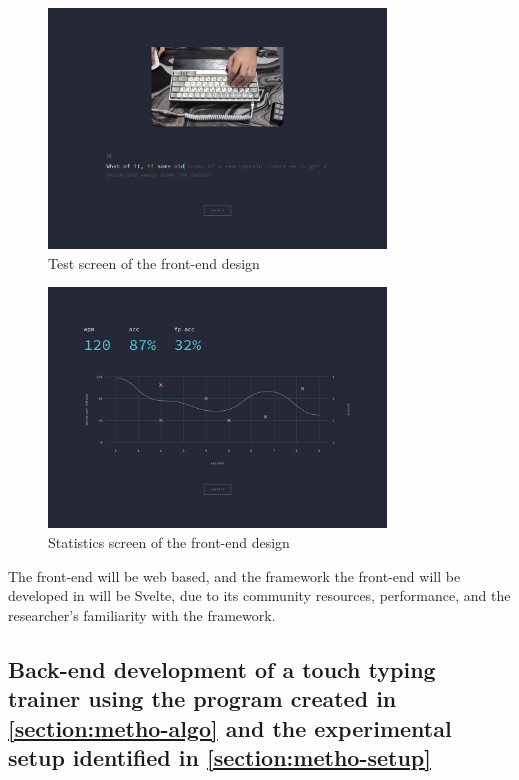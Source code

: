 \documentclass{report}
\begin{document}
\begin{figure}[H]
	\centering
	\includegraphics[width=0.8\textwidth]{ui-test.png}
	\caption{Test screen of the front-end design}
	\label{fig:ui-test}
	\centering
\end{figure}

\begin{figure}[H]
	\centering
	\includegraphics[width=0.8\textwidth]{ui-stats.png}
	\caption{Statistics screen of the front-end design}
	\label{fig:ui-stat}
	\centering
\end{figure}

The front-end will be web based, and the framework the front-end will be
developed in will be Svelte, due to its community resources, performance, and
the researcher's familiarity with the framework.



\subsection{Back-end development of a touch typing trainer using the program created
	in \ref{section:metho-algo} and the experimental setup identified in
	\ref{section:metho-setup}}
\end{document}
